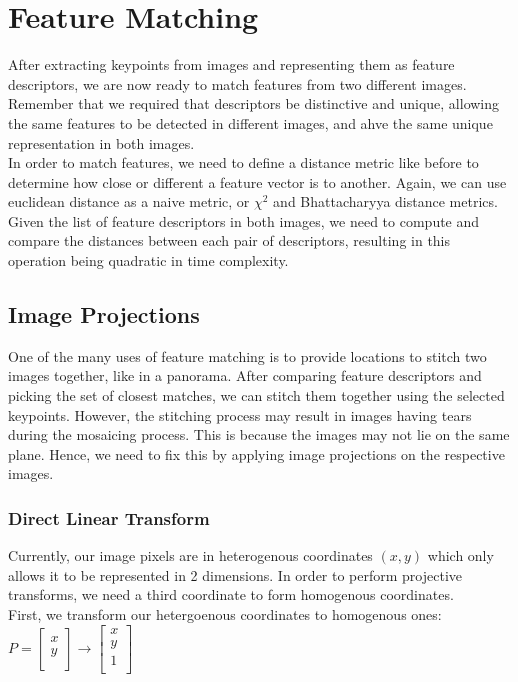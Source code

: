 \documentclass[12pt]{article}
\begin{document}
\section{Feature Matching}

After extracting keypoints from images and representing them as feature descriptors, we are now ready to match features from two different images. Remember that we required that descriptors be distinctive and unique, allowing the same features to be detected in different images, and ahve the same unique representation in both images.\\

In order to match features, we need to define a distance metric like before to determine how close or different a feature vector is to another. Again, we can use euclidean distance as a naive metric, or $\chi^2$ and Bhattacharyya distance metrics. Given the list of feature descriptors in both images, we need to compute and compare the distances between each pair of descriptors, resulting in this operation being quadratic in time complexity.

\subsection{Image Projections}

One of the many uses of feature matching is to provide locations to stitch two images together, like in a panorama. After comparing feature descriptors and picking the set of closest matches, we can stitch them together using the selected keypoints. However, the stitching process may result in images having tears during the mosaicing process. This is because the images may not lie on the same plane. Hence, we need to fix this by applying image projections on the respective images.\\

\subsubsection{Direct Linear Transform}
Currently, our image pixels are in heterogenous coordinates $(x, y)$ which only allows it to be represented in 2 dimensions. In order to perform projective transforms, we need a third coordinate to form homogenous coordinates.\\

First, we transform our hetergoenous coordinates to homogenous ones: $P = \begin{bmatrix}
x\\
y\\
\end{bmatrix} \rightarrow \begin{bmatrix}
x\\
y\\
1\\
\end{bmatrix}$\\
\end{document}
